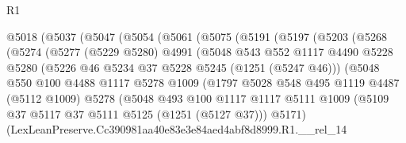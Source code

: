 \begin{lexlean}{R1}
\begin{coremodule}
                @5018
                  (@5037
                    (@5047
                      (@5054
                        (@5061
                          (@5075
                            (@5191
                              (@5197
                                (@5203
                                  (@5268
                                    (@5274
                                      (@5277
                                        (@5229 @5280)
                                        @4991
                                        (@5048
                                          @543
                                          @552
                                          @1117
                                          @4490
                                          @5228
                                          @5280
                                          (@5226 @46 @5234 @37 @5228 @5245 (@1251 (@5247 @46)))
                                          (@5048
                                            @550
                                            @100
                                            @4488
                                            @1117
                                            @5278
                                            @1009
                                            (@1797
                                              @5028
                                              @548
                                              @495
                                              @1119
                                              @4487
                                              (@5112 @1009)
                                              @5278
                                              (@5048
                                                @493
                                                @100
                                                @1117
                                                @1117
                                                @5111
                                                @1009
                                                (@5109
                                                  @37
                                                  @5117
                                                  @37
                                                  @5111
                                                  @5125
                                                  (@1251 (@5127 @37)))
                                                @5171)
                                              (LexLeanPreserve.Cc390981aa40e83e3e84aed4abf8d8999.R1.__rel_14

\end{coremodule}
\end{lexlean}
